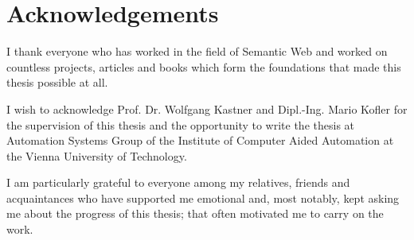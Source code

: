 \chapter*{Acknowledgements}

I thank everyone who has worked in the field of Semantic Web and worked on countless projects, articles and books which form the foundations that made this thesis possible at all.

I wish to acknowledge Prof. Dr. Wolfgang Kastner and Dipl.-Ing. Mario Kofler for the supervision of this thesis and the opportunity to write the thesis at Automation Systems Group of the Institute of Computer Aided Automation at the Vienna University of Technology.

I am particularly grateful to everyone among my relatives, friends and acquaintances who have supported me emotional and, most notably, kept asking me about the progress of this thesis; that often motivated me to carry on the work.